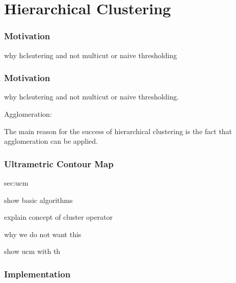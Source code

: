
\chapter{Hierarchical Clustering}\label{ch:hierarchical_clustering} 

\subsection{Motivation}\label{sec:hc_motivation}
why hclsutering and not multicut or naive thresholding


\subsection{Motivation}\label{sec:hc_motivation}
why hclsutering and not multicut or naive thresholding.


Agglomeration:


The main reason for the success of hierarchical clustering 
is the fact that agglomeration can be applied.

\begin{figure}[h]
\end{figure}





\subsection{Ultrametric Contour Map}{sec:ucm}

\begin{aenumerate} 
\item show basic algorithms 
\item explain concept of cluster operator
\item why we do not want this
\item show ucm with th
\end{aenumerate}


\subsection{Implementation}


